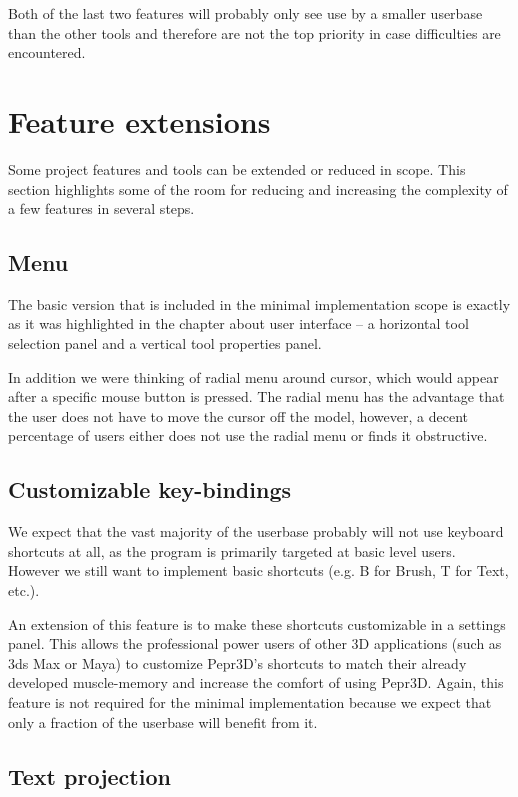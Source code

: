 Both of the last two features will probably only see use by a smaller userbase than the other tools and therefore are not the top priority in case difficulties are encountered.

\section{Feature extensions}

Some project features and tools can be extended or reduced in scope. This section highlights some of the room for reducing and increasing the complexity of a few features in several steps.


\subsection{Menu}

The basic version that is included in the minimal implementation scope is exactly as it was highlighted in the chapter about user interface -- a horizontal tool selection panel and a vertical tool properties panel.

In addition we were thinking of radial menu around cursor, which would appear after a specific mouse button is pressed. The radial menu has the advantage that the user does not have to move the cursor off the model, however, a decent percentage of users either does not use the radial menu or finds it obstructive.

\subsection{Customizable key-bindings}

We expect that the vast majority of the userbase probably will not use keyboard shortcuts at all, as the program is primarily targeted at basic level users. However we still want to implement basic shortcuts (e.g. B for Brush, T for Text, etc.).

An extension of this feature is to make these shortcuts customizable in a settings panel. This allows the professional power users of other 3D applications (such as 3ds Max or Maya) to customize Pepr3D's shortcuts to match their already developed muscle-memory and increase the comfort of using Pepr3D. Again, this feature is not required for the minimal implementation because we expect that only a fraction of the userbase will benefit from it.


\subsection{Text projection}

